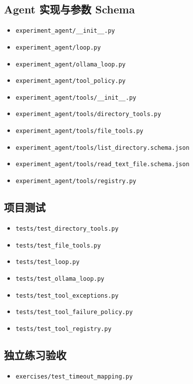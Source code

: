 \documentclass[UTF8,zihao=-4,fontset=fandol]{ctexart}
\begin{document}
\subsection{Agent 实现与参数 Schema}
\begin{itemize}
\item \nolinkurl{experiment_agent/__init__.py}
\item \nolinkurl{experiment_agent/loop.py}
\item \nolinkurl{experiment_agent/ollama_loop.py}
\item \nolinkurl{experiment_agent/tool_policy.py}
\item \nolinkurl{experiment_agent/tools/__init__.py}
\item \nolinkurl{experiment_agent/tools/directory_tools.py}
\item \nolinkurl{experiment_agent/tools/file_tools.py}
\item \nolinkurl{experiment_agent/tools/list_directory.schema.json}
\item \nolinkurl{experiment_agent/tools/read_text_file.schema.json}
\item \nolinkurl{experiment_agent/tools/registry.py}
\end{itemize}

\subsection{项目测试}
\begin{itemize}
\item \nolinkurl{tests/test_directory_tools.py}
\item \nolinkurl{tests/test_file_tools.py}
\item \nolinkurl{tests/test_loop.py}
\item \nolinkurl{tests/test_ollama_loop.py}
\item \nolinkurl{tests/test_tool_exceptions.py}
\item \nolinkurl{tests/test_tool_failure_policy.py}
\item \nolinkurl{tests/test_tool_registry.py}
\end{itemize}

\subsection{独立练习验收}
\begin{itemize}
\item \nolinkurl{exercises/test_timeout_mapping.py}
\end{itemize}
\end{document}
